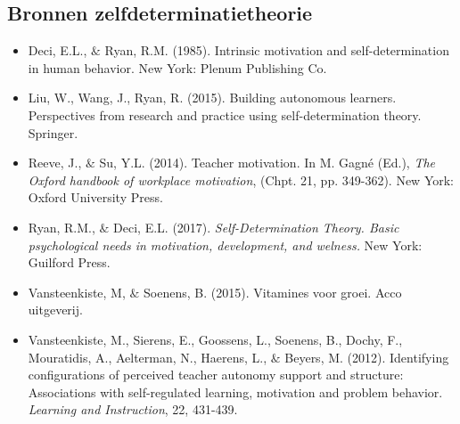 \documentclass{article}
\begin{document}
\subsection{Bronnen zelfdeterminatietheorie}
\begin{itemize}
	\item {\fontsize{11pt}{13.2pt}\selectfont Deci, E.L., $\&$  Ryan, R.M. (1985). Intrinsic motivation and self-determination in human behavior. New York: Plenum Publishing Co.\par}\par

	\item {\fontsize{11pt}{13.2pt}\selectfont Liu, W., Wang, J., Ryan, R. (2015). Building autonomous learners. Perspectives from research and practice using self-determination theory. Springer.\par}\par

	\item {\fontsize{11pt}{13.2pt}\selectfont Reeve, J., $\&$  Su, Y.L. (2014). Teacher motivation. In M. Gagné (Ed.), \textit{The Oxford handbook of workplace motivation}, (Chpt. 21, pp. 349-362). New York: Oxford University Press.\par}\par

	\item {\fontsize{11pt}{13.2pt}\selectfont Ryan, R.M., $\&$  Deci, E.L. (2017). \textit{Self-Determination Theory. Basic psychological needs in motivation, development, and welness.} New York: Guilford Press. \par}\par

	\item {\fontsize{11pt}{13.2pt}\selectfont Vansteenkiste, M, $\&$  Soenens, B. (2015). Vitamines voor groei. Acco uitgeverij. \par}\par

	\item {\fontsize{11pt}{13.2pt}\selectfont Vansteenkiste, M., Sierens, E., Goossens, L., Soenens, B., Dochy, F., Mouratidis, A., Aelterman, N., Haerens, L., $\&$  Beyers, M. (2012). Identifying configurations of perceived teacher autonomy support and structure: Associations with self-regulated learning, motivation and problem behavior. \textit{Learning and Instruction}, 22, 431-439.\par}
\end{itemize}\par
\end{document}
